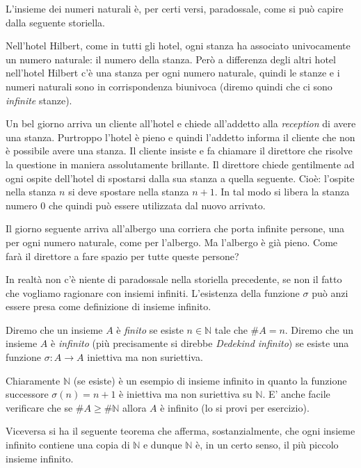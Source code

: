 \documentclass[italian,a4paper,hidelinks,headinclude]{scrartcl}
\newcommand{\NN}{{\mathbb N}}
\newcommand{\myemph}[1]{\emph{#1}\marginpar{#1}}
\begin{document}
L'insieme dei numeri naturali è, per certi versi, paradossale, come si può
capire dalla seguente storiella.

\begin{exercise}
  Nell'hotel Hilbert, come in tutti gli hotel, ogni stanza ha associato univocamente
  un numero naturale: il numero della stanza.
  Però a differenza degli altri hotel nell'hotel Hilbert c'è una stanza per
  ogni numero naturale, quindi le stanze e i numeri naturali sono in corrispondenza
  biunivoca (diremo quindi che ci sono \emph{infinite} stanze).

  Un bel giorno arriva un cliente all'hotel e chiede all'addetto
  alla \emph{reception} di avere una stanza. Purtroppo l'hotel è pieno e
  quindi l'addetto informa il cliente che non è possibile avere una stanza.
  Il cliente insiste e fa chiamare il direttore che risolve la questione in
  maniera assolutamente brillante.
  Il direttore chiede gentilmente ad ogni ospite dell'hotel di spostarsi dalla sua
  stanza a quella seguente. Cioè: l'ospite nella stanza $n$ si deve spostare nella
  stanza $n+1$. In tal modo si libera la stanza numero $0$ che quindi può essere
  utilizzata dal nuovo arrivato.

  Il giorno seguente arriva all'albergo una corriera che porta infinite persone,
  una per ogni numero naturale, come per l'albergo. Ma l'albergo è già pieno.
  Come farà il direttore a fare spazio per tutte queste persone?
\end{exercise}

In realtà non c'è niente di paradossale nella storiella precedente, se non il
fatto che vogliamo ragionare con insiemi infiniti.
L'esistenza della funzione $\sigma$ può anzi essere presa come definizione
di insieme infinito.

\begin{definition}
  Diremo che un insieme $A$ è \myemph{finito}
  se esiste $n\in \NN$ tale che $\#A = n$.
  Diremo che un insieme $A$ è \myemph{infinito} (più precisamente si direbbe
  \emph{Dedekind infinito})
  se esiste una funzione $\sigma\colon A \to A$
  iniettiva ma non suriettiva.
\end{definition}

Chiaramente $\NN$ (se esiste) è un esempio di insieme infinito in quanto
la funzione successore $\sigma(n) = n+1$ è iniettiva ma non suriettiva
su $\NN$. E' anche facile verificare che se $\#A \ge \#\NN$ allora $A$
è infinito (lo si provi per esercizio).

Viceversa si ha il seguente teorema che afferma, sostanzialmente,
che ogni insieme infinito contiene una copia di $\NN$ e dunque $\NN$ è,
in un certo senso, il più piccolo insieme infinito.
\end{document}
